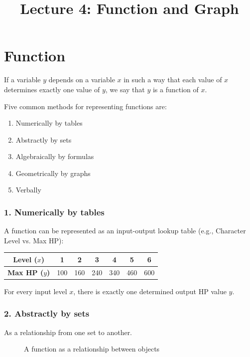 \title{Lecture 4: Function and Graph}
\date{}
\frame{\titlepage}
\newcommand{\axes}[4]{\draw[<->](#1,0) -- (#2,0) node[right] {$x$}; \draw[<->](0,#3)--(0,#4) node[above] {$y$};}

\section{Function}
\frame{\sectionpage}

\begin{frame}
\begin{defn}{}{}
If a variable $y$ depends on a variable $x$ in such a way that each value of $x$ determines exactly one value of $y$, we say that $y$ is a function of $x$.
\end{defn}

Five common methods for representing functions are:
\begin{enumerate}
\item Numerically by tables
\item Abstractly by sets
\item Algebraically by formulas
\item Geometrically by graphs
\item Verbally
\end{enumerate}
\end{frame}

\begin{frame}
\frametitle{1. Numerically by tables}
A function can be represented as an input-output lookup table (e.g., Character Level vs. Max HP):
\begin{table}[h!]
\centering
\begin{tabular}{|c||c|c|c|c|c|c|}
\hline
\textbf{Level ($x$)} & 1 & 2 & 3 & 4 & 5 & 6 \\
\hline
\textbf{Max HP ($y$)} & 100 & 160 & 240 & 340 & 460 & 600 \\
\hline
\end{tabular}
\end{table}
\medskip
For every input level $x$, there is exactly one determined output HP value $y$.
\end{frame}


\begin{frame}
\frametitle{2. Abstractly by sets}
As a relationship from one set to another.
\begin{figure}[h!]
\centering
{}
\caption{A function as a relationship between objects}
\end{figure}
\end{frame}

